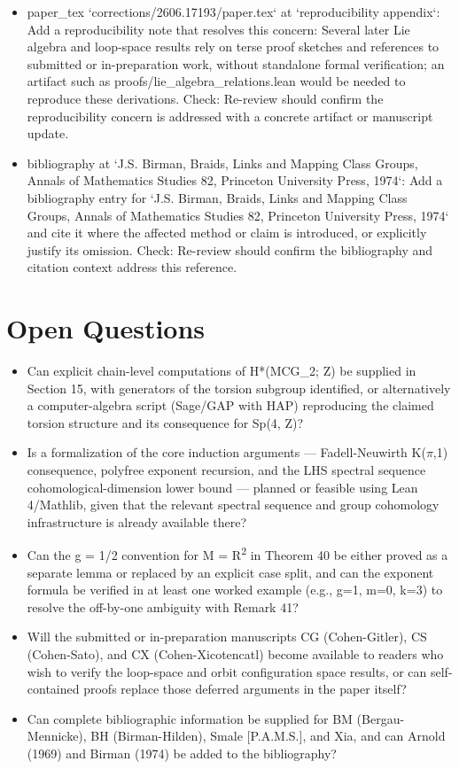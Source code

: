 \documentclass[11pt]{article}
\begin{document}
\begin{itemize}[leftmargin=*]
  \item [open] paper\_tex `corrections/2606.17193/paper.tex` at `reproducibility appendix`: Add a reproducibility note that resolves this concern: Several later Lie algebra and loop-space results rely on terse proof sketches and references to submitted or in-preparation work, without standalone formal verification; an artifact such as proofs/lie\_algebra\_relations.lean would be needed to reproduce these derivations. Check: Re-review should confirm the reproducibility concern is addressed with a concrete artifact or manuscript update.
  \item [open] bibliography at `J.S. Birman, Braids, Links and Mapping Class Groups, Annals of Mathematics Studies 82, Princeton University Press, 1974`: Add a bibliography entry for `J.S. Birman, Braids, Links and Mapping Class Groups, Annals of Mathematics Studies 82, Princeton University Press, 1974` and cite it where the affected method or claim is introduced, or explicitly justify its omission. Check: Re-review should confirm the bibliography and citation context address this reference.
\end{itemize}

\section*{Open Questions}
\begin{itemize}[leftmargin=*]
  \item Can explicit chain-level computations of H*(MCG\_2; Z) be supplied in Section 15, with generators of the torsion subgroup identified, or alternatively a computer-algebra script (Sage/GAP with HAP) reproducing the claimed torsion structure and its consequence for Sp(4, Z)?
  \item Is a formalization of the core induction arguments --- Fadell-Neuwirth K(\ensuremath{\pi},1) consequence, polyfree exponent recursion, and the LHS spectral sequence cohomological-dimension lower bound --- planned or feasible using Lean 4/Mathlib, given that the relevant spectral sequence and group cohomology infrastructure is already available there?
  \item Can the g = 1/2 convention for M = R\textsuperscript{2} in Theorem 40 be either proved as a separate lemma or replaced by an explicit case split, and can the exponent formula be verified in at least one worked example (e.g., g=1, m=0, k=3) to resolve the off-by-one ambiguity with Remark 41?
  \item Will the submitted or in-preparation manuscripts CG (Cohen-Gitler), CS (Cohen-Sato), and CX (Cohen-Xicotencatl) become available to readers who wish to verify the loop-space and orbit configuration space results, or can self-contained proofs replace those deferred arguments in the paper itself?
  \item Can complete bibliographic information be supplied for BM (Bergau-Mennicke), BH (Birman-Hilden), Smale [P.A.M.S.], and Xia, and can Arnold (1969) and Birman (1974) be added to the bibliography?
\end{itemize}
\end{document}
